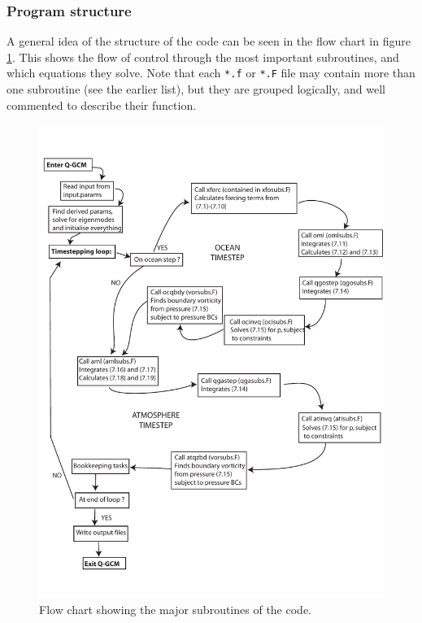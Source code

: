 \documentclass[11pt, a4paper,twoside]{article}
\numberwithin{equation}{section}
\begin{document}
\subsubsection{Program structure}
A general idea of the structure of the code can be seen in the flow chart in figure \ref{fig:code}.
This shows the flow of control through the most important subroutines, and which equations they solve.
Note that each \verb=*.f= or \verb=*.F= file may contain more than one subroutine (see the earlier list), but they are grouped logically, and well commented to describe their function.
\begin{figure}[!ht]
\includegraphics[width=\hsize]{code}
\caption{\small Flow chart showing the major subroutines of the code.  \label{fig:code}}
\end{figure}
\end{document}
